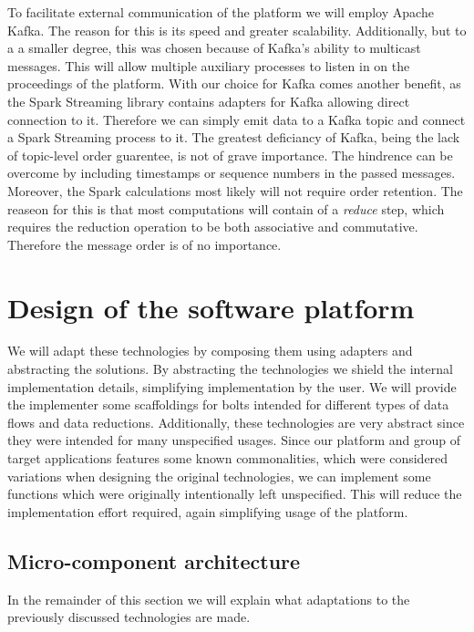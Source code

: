 To facilitate external communication of the platform we will employ Apache Kafka. The reason for this is its speed and greater scalability. Additionally, but to a a smaller degree, this was chosen because of Kafka's ability to multicast messages. This will allow multiple auxiliary processes to listen in on the proceedings of the platform. With our choice for Kafka comes another benefit, as the Spark Streaming library contains adapters for Kafka allowing direct connection to it. Therefore we can simply emit data to a Kafka topic and connect a Spark Streaming process to it. The greatest deficiancy of Kafka, being the lack of topic-level order guarentee, is not of grave importance. The hindrence can be overcome by including timestamps or sequence numbers in the passed messages. Moreover, the Spark calculations most likely will not require order retention. The reaseon for this is that most computations will contain of a \emph{reduce} step, which requires the reduction operation to be both associative and commutative\cite{ass-comm}. Therefore the message order is of no importance.

\section{Design of the software platform}
We will adapt these technologies by composing them using adapters and abstracting the solutions. By abstracting the technologies we shield the internal implementation details, simplifying implementation by the user. We will provide the implementer some scaffoldings for bolts intended for different types of data flows and data reductions. Additionally, these technologies are very abstract since they were intended for many unspecified usages. Since our platform and group of target applications features some known commonalities, which were considered variations when designing the original technologies, we can implement some functions which were originally intentionally left unspecified. This will reduce the implementation effort required, again simplifying usage of the platform. \cite{facade_pattern} 

\subsection{Micro-component architecture}
In the remainder of this section we will explain what adaptations to the previously discussed technologies are made.

